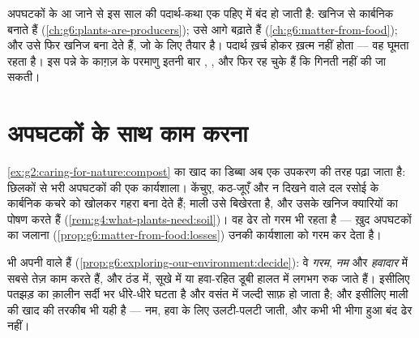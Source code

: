 \begin{remark}[घेरा पूरा होता है]\label{rem:g6:decomposers-and-soil:circle}
अपघटकों के आ जाने से इस साल की पदार्थ-कथा एक पहिए में बंद हो जाती है:
 खनिज से कार्बनिक बनाते हैं
(\cref{ch:g6:plants-are-producers});  उसे आगे बढ़ाते हैं
(\cref{ch:g6:matter-from-food}); और  उसे फिर खनिज बना देते हैं,
जो  के लिए तैयार है। पदार्थ ख़र्च होकर ख़त्म नहीं होता --- वह
घूमता रहता है। इस पन्ने के काग़ज़ के परमाणु इतनी बार , , 
और फिर  रह चुके हैं कि गिनती नहीं की जा सकती।
\end{remark}

\section{अपघटकों के साथ काम करना}

\begin{example}[खाद, आख़िरकार समझाई हुई]\label{ex:g6:decomposers-and-soil:compost}
\cref{ex:g2:caring-for-nature:compost} का खाद का डिब्बा अब एक उपकरण की
तरह पढ़ा जाता है: छिलकों से भरी अपघटकों की एक कार्यशाला। केंचुए,
कठ-जूएँ और न दिखने वाले दल रसोई के कार्बनिक कचरे को खोलकर गहरा 
बना देते हैं; माली उसे बिखेरता है, और उसके खनिज क्यारियों का पोषण करते
हैं (\cref{rem:g4:what-plants-need:soil})। वह ढेर तो गरम भी रहता है ---
ख़ुद अपघटकों का जलाना
(\cref{prop:g6:matter-from-food:losses}) उनकी कार्यशाला को गरम कर देता
है।
\end{example}

\begin{proposition}[काम को क्या तेज़ करता है और क्या धीमा]\label{prop:g6:decomposers-and-soil:speed}
 भी अपनी  वाले  हैं
(\cref{prop:g6:exploring-our-environment:decide}): वे \emph{गरम},
\emph{नम} और \emph{हवादार} में सबसे तेज़ काम करते हैं, और ठंड में, सूखे
में या हवा-रहित डूबी हालत में लगभग रुक जाते हैं। इसीलिए पतझड़ का क़ालीन
सर्दी भर धीरे-धीरे घटता है और वसंत में जल्दी साफ़ हो जाता है; और इसीलिए
माली की खाद की तरकीब भी यही है --- नम, हवा के लिए उलटी-पलटी जाती, और
कभी भी भीगा हुआ बंद ढेर नहीं।
\end{proposition}
\admitted

